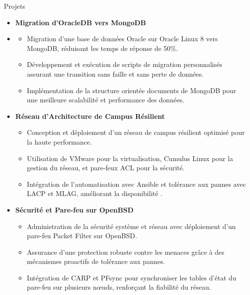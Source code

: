 \documentclass{resume}
\begin{document}
\begin{rSection}{Projets}
\begin{itemize}[leftmargin=*,label= ]
        
        \item \textbf{\large Migration d'OracleDB vers MongoDB} 
        \item \begin{itemize}
            \setlength{\itemsep}{-6pt} %
            \item Migration d'une base de données Oracle sur Oracle Linux 8 vers MongoDB, réduisant les temps de réponse de 50\%.
            \item Développement et exécution de scripts de migration personnalisés assurant une transition sans faille et sans perte de données.
            \item Implémentation de la structure orientée documents de MongoDB pour une meilleure scalabilité et performance des données.
        \end{itemize}
        
        
        \item \textbf{\large Réseau d'Architecture de Campus Résilient}
        \begin{itemize}
            \setlength{\itemsep}{-6pt} %
            \item Conception et déploiement d'un réseau de campus résilient optimisé pour la haute performance.
            \item Utilisation de VMware pour la virtualisation, Cumulus Linux pour la gestion du réseau, et pare-feux ACL pour la sécurité.
            \item Intégration de l'automatisation avec Ansible et tolérance aux pannes avec LACP et MLAG, améliorant la disponibilité .
        \end{itemize}
        
        \item \textbf{\large Sécurité et Pare-feu sur OpenBSD}
        \begin{itemize}
            \setlength{\itemsep}{-6pt} %
            \item Administration de la sécurité système et réseau avec déploiement d'un pare-feu Packet Filter sur OpenBSD.
            \item Assurance d'une protection robuste contre les menaces grâce à des mécanismes proactifs de tolérance aux pannes.
            \item Intégration de CARP et PFsync pour synchroniser les tables d'état du pare-feu sur plusieurs nœuds, renforçant la fiabilité du réseau.
        \end{itemize}
        

\end{itemize}
\end{rSection}
\end{document}
